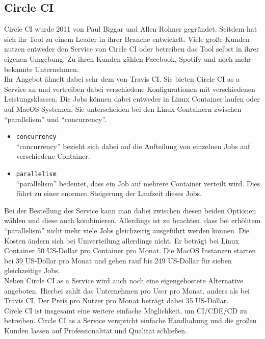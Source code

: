 \subsection{Circle CI}
Circle CI wurde 2011 von Paul Biggar und Allen Rohner gegründet. Seitdem hat sich ihr Tool zu einem Leader in ihrer Branche entwickelt.\autocite[Vgl.][]{Forrester.2017} Viele große Kunden nutzen entweder den Service von Circle CI oder betreiben das Tool selbst in ihrer eigenen Umgebung. Zu ihren Kunden zählen Facebook, Spotify und noch mehr bekannte Unternehmen.\autocite[Vgl.][]{Circle.2019} \\
Ihr Angebot ähnelt dabei sehr dem von Travis CI. Sie bieten Circle CI as a Service an und vertreiben dabei verschiedene Konfigurationen mit verschiedenen Leistungsklassen. Die Jobs können dabei entweder in Linux Container laufen oder auf MacOS Systemen. Sie unterscheiden bei den Linux Containern zwischen \enquote{parallelism} und \enquote{concurrency}\autocite[Vgl.][]{Circle.2019}.
\begin{itemize}
	\item \texttt{concurrency}\\
	\enquote{concurrency} bezieht sich dabei auf die Aufteilung von einzelnen Jobs auf verschiedene Container.
	\item \texttt{parallelism}\\
	\enquote{parallelism} bedeutet, dass ein Job auf mehrere Container verteilt wird. Dies führt zu einer enormen Steigerung der Laufzeit dieses Jobs.
\end{itemize}
Bei der Bestellung des Service kann man dabei zwischen diesen beiden Optionen wählen und diese auch kombinieren. Allerdings ist zu beachten, dass bei erhöhtem \enquote{parallelism} nicht mehr viele Jobs gleichzeitig ausgeführt werden können. Die Kosten ändern sich bei Umverteilung allerdings nicht. Er beträgt bei Linux Container 50 US-Dollar pro Container pro Monat. Die MacOS Instanzen starten bei 39 US-Dollar pro Monat und gehen rauf bis 249 US-Dollar für sieben gleichzeitige Jobs.\autocite[Vgl.][]{Circle.2019}\\
Neben Circle CI as a Service wird auch noch eine eigengehostete Alternative angeboten. Hierbei zahlt das Unternehmen pro User pro Monat, anders als bei Travis CI. Der Preis pro Nutzer pro Monat beträgt dabei 35 US-Dollar.\autocite[Vgl.][]{Circle.2019}\\
Circle CI ist insgesamt eine weitere einfache Möglichkeit, um \ac{CI}/\ac{CDE}/\ac{CD} zu betreiben. Circle CI as a Service verspricht einfache Handhabung und die großen Kunden lassen auf Professionalität und Qualität schließen.
